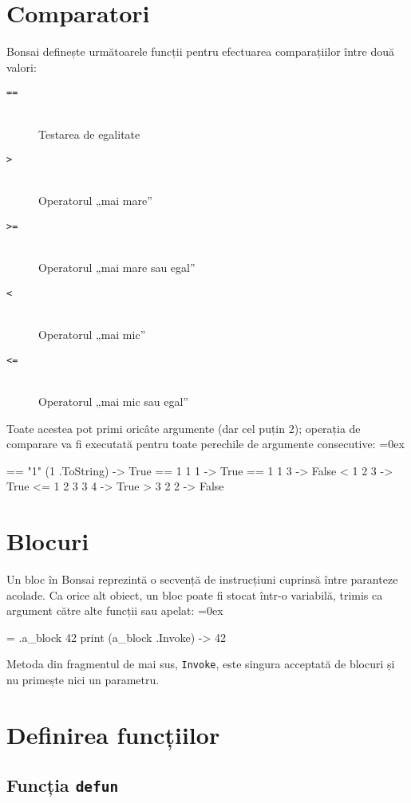 \documentclass[12pt,a4paper]{memoir}
\renewcommand{\c}{\texttt}
\newenvironment{code}
{
\definecolor{shadecolor}{gray}{0.91}
\topsep=0ex
\relax
\shaded
\verbatim
}
{
\endverbatim
\endshaded
}
\begin{document}
\section{Comparatori}

Bonsai definește următoarele funcții pentru efectuarea comparațiilor între două valori:

\begin{description}
\item[\c{==}]\hfill\\Testarea de egalitate
\item[\c{>}]\hfill\\Operatorul „mai mare”
\item[\c{>=}]\hfill\\Operatorul „mai mare sau egal”
\item[\c{<}]\hfill\\Operatorul „mai mic”
\item[\c{<=}]\hfill\\Operatorul „mai mic sau egal”
\end{description}

Toate acestea pot primi oricâte argumente (dar cel puțin 2); operația de comparare va fi executată pentru toate perechile de argumente consecutive:
\begin{code}
== "1" (1 .ToString)
  -> True
== 1 1 1
  -> True
== 1 1 3
  -> False
< 1 2 3
  -> True
<= 1 2 3 3 4
  -> True
> 3 2 2
  -> False
\end{code}

\section{Blocuri}

Un bloc în Bonsai reprezintă o secvență de instrucțiuni cuprinsă între paranteze acolade. Ca orice alt obiect, un bloc poate fi stocat într-o variabilă, trimis ca argument către alte funcții sau apelat:
\begin{code}
= .a_block { 42 }
print (a_block .Invoke)
  -> 42
\end{code}
Metoda din fragmentul de mai sus, \c{Invoke}, este singura acceptată de blocuri și nu primește nici un parametru. 

\section{Definirea funcțiilor}\label{sec:defun}

\subsection{Funcția \c{defun}}
\end{document}

